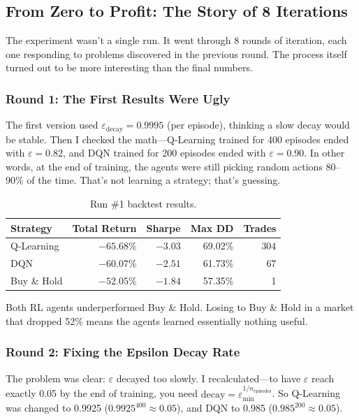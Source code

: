 \documentclass[11pt,a4paper]{article}
\begin{document}
\subsection{From Zero to Profit: The Story of 8 Iterations}

The experiment wasn't a single run. It went through 8 rounds of iteration, each one responding to problems discovered in the previous round. The process itself turned out to be more interesting than the final numbers.

\subsubsection{Round 1: The First Results Were Ugly}

The first version used $\varepsilon_{\text{decay}} = 0.9995$ (per episode), thinking a slow decay would be stable. Then I checked the math---Q-Learning trained for 400 episodes ended with $\varepsilon = 0.82$, and DQN trained for 200 episodes ended with $\varepsilon = 0.90$. In other words, at the end of training, the agents were still picking random actions 80--90\% of the time. That's not learning a strategy; that's guessing.

\begin{table}[H]
\centering
\caption{Run \#1 backtest results.}
\begin{tabular}{lrrrr}
\toprule
Strategy & Total Return & Sharpe & Max DD & Trades \\
\midrule
Q-Learning & $-65.68\%$ & $-3.03$ & 69.02\% & 304 \\
DQN        & $-60.07\%$ & $-2.51$ & 61.73\% & 67 \\
Buy \& Hold & $-52.05\%$ & $-1.84$ & 57.35\% & 1 \\
\bottomrule
\end{tabular}
\end{table}

Both RL agents underperformed Buy \& Hold. Losing to Buy \& Hold in a market that dropped 52\% means the agents learned essentially nothing useful.

\subsubsection{Round 2: Fixing the Epsilon Decay Rate}

The problem was clear: $\varepsilon$ decayed too slowly. I recalculated---to have $\varepsilon$ reach exactly 0.05 by the end of training, you need $\text{decay} = \varepsilon_{\min}^{1/n_{\text{episodes}}}$. So Q-Learning was changed to 0.9925 ($0.9925^{400} \approx 0.05$), and DQN to 0.985 ($0.985^{200} \approx 0.05$).
\end{document}
